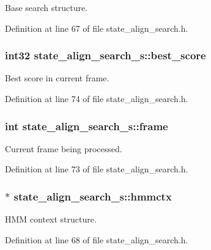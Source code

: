 Base search structure. 



Definition at line 67 of file state\-\_\-align\-\_\-search.\-h.

\subsubsection[{best\-\_\-score}]{\setlength{\rightskip}{0pt plus 5cm}int32 state\-\_\-align\-\_\-search\-\_\-s\-::best\-\_\-score}\label{structstate__align__search__s_a1810f343c6ae382f5ed0a5eb02d33037}


Best score in current frame. 



Definition at line 74 of file state\-\_\-align\-\_\-search.\-h.

\subsubsection[{frame}]{\setlength{\rightskip}{0pt plus 5cm}int state\-\_\-align\-\_\-search\-\_\-s\-::frame}\label{structstate__align__search__s_aa520abfdb4d0bca2b769f281839637a9}


Current frame being processed. 



Definition at line 73 of file state\-\_\-align\-\_\-search.\-h.

\subsubsection[{hmmctx}]{$\ast$ state\-\_\-align\-\_\-search\-\_\-s\-::hmmctx}\label{structstate__align__search__s_a683e76dbcc87cde89ca5d45b4b91c1e9}


H\-M\-M context structure. 



Definition at line 68 of file state\-\_\-align\-\_\-search.\-h.

